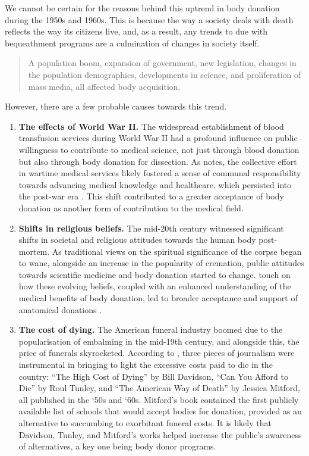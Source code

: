 We cannot be certain for the reasons behind this uptrend in body donation during the 1950s and 1960s. This is because the way a society deals with death reflects the way its citizens live, and, as a result, any trends to due with bequeathment programs are a culmination of changes in society itself. 
\begin{quote}
A population boom, expansion of government, new legislation, changes in the population demographics, developments in science, and proliferation of mass media, all affected body acquisition. \parencite{garment_2007_usadonors}
\end{quote}
However, there are a few probable causes towards this trend.
\begin{enumerate}
    \item \textbf{The effects of World War II.} The widespread establishment of blood transfusion services during World War II had a profound influence on public willingness to contribute to medical science, not just through blood donation but also through body donation for dissection. As \citeauthor{richardson_2006_ukdonors} notes, the collective effort in wartime medical services likely fostered a sense of communal responsibility towards advancing medical knowledge and healthcare, which persisted into the post-war era \parencite{richardson_2006_ukdonors}. This shift contributed to a greater acceptance of body donation as another form of contribution to the medical field.
    \item \textbf{Shifts in religious beliefs.} The mid-20th century witnessed significant shifts in societal and religious attitudes towards the human body post-mortem. As traditional views on the spiritual significance of the corpse began to wane, alongside an increase in the popularity of cremation, public attitudes towards scientific medicine and body donation started to change. \citeauthor{jones_1991_nzdonors} touch on how these evolving beliefs, coupled with an enhanced understanding of the medical benefits of body donation, led to broader acceptance and support of anatomical donations \parencite{jones_1991_nzdonors}.
    \item \textbf{The cost of dying.} The American funeral industry boomed due to the popularisation of embalming in the mid-19th century, and alongside this, the price of funerals skyrocketed. According to \citeauthor{garment_2007_usadonors}, three pieces of journalism were instrumental in bringing to light the excessive costs paid to die in the country: ``The High Cost of Dying'' by Bill Davidson, ``Can You Afford to Die'' by Roul Tunley, and ``The American Way of Death'' by Jessica Mitford, all published in the `50s and `60s. Mitford's book contained the first publicly available list of schools that would accept bodies for donation, provided as an alternative to succumbing to exorbitant funeral costs. It is likely that Davidson, Tunley, and Mitford's works helped increase the public's awareness of alternatives, a key one being body donor programs.
\end{enumerate}


